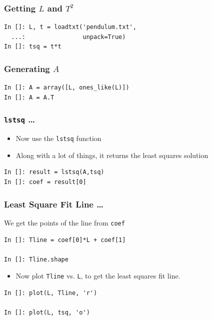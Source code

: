\documentclass[14pt,compress]{beamer}
\newcounter{time}
\newcommand{\inctime}[1]{\addtocounter{time}{#1}{\tiny \thetime\ m}}
\newcommand{\typ}[1]{\lstinline{#1}}
\begin{document}
\begin{frame}[fragile]
\frametitle{Getting $L$ and $T^2$}
\begin{lstlisting}
In []: L, t = loadtxt('pendulum.txt',
  ...:                unpack=True)
In []: tsq = t*t
\end{lstlisting}
\end{frame}

\begin{frame}[fragile]
\frametitle{Generating $A$}
\begin{lstlisting}
In []: A = array([L, ones_like(L)])
In []: A = A.T
\end{lstlisting}
\end{frame}

\begin{frame}[fragile]
\frametitle{\typ{lstsq} \ldots}
\begin{itemize}
\item Now use the \typ{lstsq} function
\item Along with a lot of things, it returns the least squares solution
\end{itemize}
\begin{lstlisting}
In []: result = lstsq(A,tsq)
In []: coef = result[0]
\end{lstlisting}
\end{frame}

\begin{frame}[fragile]
\frametitle{Least Square Fit Line \ldots}
We get the points of the line from \typ{coef}
\begin{lstlisting}
In []: Tline = coef[0]*L + coef[1]

In []: Tline.shape
\end{lstlisting}
\begin{itemize}
\item Now plot \typ{Tline} vs. \typ{L}, to get the least squares fit line.
\end{itemize}
\begin{lstlisting}
In []: plot(L, Tline, 'r')

In []: plot(L, tsq, 'o')
\end{lstlisting}
\inctime{10}
\end{frame}
\end{document}
